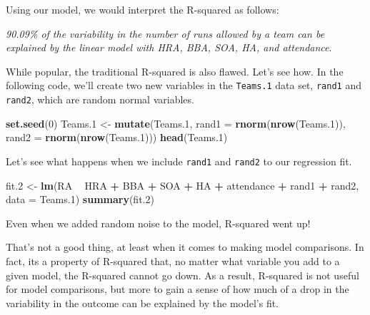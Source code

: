 \documentclass[]{article}
\newenvironment{Shaded}{\begin{snugshade}}{\end{snugshade}}
\newcommand{\DataTypeTok}[1]{\textcolor[rgb]{0.13,0.29,0.53}{#1}}
\newcommand{\DecValTok}[1]{\textcolor[rgb]{0.00,0.00,0.81}{#1}}
\newcommand{\FloatTok}[1]{\textcolor[rgb]{0.00,0.00,0.81}{#1}}
\newcommand{\KeywordTok}[1]{\textcolor[rgb]{0.13,0.29,0.53}{\textbf{#1}}}
\newcommand{\NormalTok}[1]{#1}
\newcommand{\OperatorTok}[1]{\textcolor[rgb]{0.81,0.36,0.00}{\textbf{#1}}}
\newcommand{\StringTok}[1]{\textcolor[rgb]{0.31,0.60,0.02}{#1}}
\begin{document}
Using our model, we would interpret the R-squared as follows:

\textit{90.09\% of the variability in the number of runs allowed by a team can be explained by the linear model with HRA, BBA, SOA, HA, and attendance}.

While popular, the traditional R-squared is also flawed. Let's see how.
In the following code, we'll create two new variables in the
\texttt{Teams.1} data set, \texttt{rand1} and \texttt{rand2}, which are
random normal variables.

\begin{Shaded}
\begin{Highlighting}[]
\KeywordTok{set.seed}\NormalTok{(}\DecValTok{0}\NormalTok{)}
\NormalTok{Teams}\FloatTok{.1}\NormalTok{ <-}\StringTok{ }\KeywordTok{mutate}\NormalTok{(Teams}\FloatTok{.1}\NormalTok{, }
                  \DataTypeTok{rand1 =} \KeywordTok{rnorm}\NormalTok{(}\KeywordTok{nrow}\NormalTok{(Teams}\FloatTok{.1}\NormalTok{)),}
                  \DataTypeTok{rand2 =} \KeywordTok{rnorm}\NormalTok{(}\KeywordTok{nrow}\NormalTok{(Teams}\FloatTok{.1}\NormalTok{)))}
\KeywordTok{head}\NormalTok{(Teams}\FloatTok{.1}\NormalTok{)}
\end{Highlighting}
\end{Shaded}

Let's see what happens when we include \texttt{rand1} and \texttt{rand2}
to our regression fit.

\begin{Shaded}
\begin{Highlighting}[]
\NormalTok{fit}\FloatTok{.2}\NormalTok{ <-}\StringTok{ }\KeywordTok{lm}\NormalTok{(RA }\OperatorTok{~}\StringTok{ }\NormalTok{HRA }\OperatorTok{+}\StringTok{ }\NormalTok{BBA }\OperatorTok{+}\StringTok{ }\NormalTok{SOA }\OperatorTok{+}\StringTok{ }\NormalTok{HA }\OperatorTok{+}\StringTok{ }\NormalTok{attendance }\OperatorTok{+}\StringTok{ }\NormalTok{rand1 }\OperatorTok{+}\StringTok{ }\NormalTok{rand2, }\DataTypeTok{data =}\NormalTok{ Teams}\FloatTok{.1}\NormalTok{)}
\KeywordTok{summary}\NormalTok{(fit}\FloatTok{.2}\NormalTok{)}
\end{Highlighting}
\end{Shaded}

Even when we added random noise to the model, R-squared went up!

That's not a good thing, at least when it comes to making model
comparisons. In fact, its a property of R-squared that, no matter what
variable you add to a given model, the R-squared cannot go down. As a
result, R-squared is not useful for model comparisons, but more to gain
a sense of how much of a drop in the variability in the outcome can be
explained by the model's fit.
\end{document}
